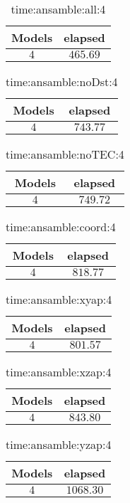 \begin{table}[!ht]
	\centering
	\begin{tabular}{|c|c|}
		\hline
		Models & elapsed \\ \hline
		$4$ & $465.69$ \\ \hline
	\end{tabular}
	\caption{time:ansamble:all:4}
	\label{tab:time:ansamble:all:4}
\end{table}

\begin{table}[!ht]
	\centering
	\begin{tabular}{|c|c|}
		\hline
		Models & elapsed \\ \hline
		$4$ & $743.77$ \\ \hline
	\end{tabular}
	\caption{time:ansamble:noDst:4}
	\label{tab:time:ansamble:noDst:4}
\end{table}

\begin{table}[!ht]
	\centering
	\begin{tabular}{|c|c|}
		\hline
		Models & elapsed \\ \hline
		$4$ & $749.72$ \\ \hline
	\end{tabular}
	\caption{time:ansamble:noTEC:4}
	\label{tab:time:ansamble:noTEC:4}
\end{table}

\begin{table}[!ht]
	\centering
	\begin{tabular}{|c|c|}
		\hline
		Models & elapsed \\ \hline
		$4$ & $818.77$ \\ \hline
	\end{tabular}
	\caption{time:ansamble:coord:4}
	\label{tab:time:ansamble:coord:4}
\end{table}

\begin{table}[!ht]
	\centering
	\begin{tabular}{|c|c|}
		\hline
		Models & elapsed \\ \hline
		$4$ & $801.57$ \\ \hline
	\end{tabular}
	\caption{time:ansamble:xyap:4}
	\label{tab:time:ansamble:xyap:4}
\end{table}

\begin{table}[!ht]
	\centering
	\begin{tabular}{|c|c|}
		\hline
		Models & elapsed \\ \hline
		$4$ & $843.80$ \\ \hline
	\end{tabular}
	\caption{time:ansamble:xzap:4}
	\label{tab:time:ansamble:xzap:4}
\end{table}

\begin{table}[!ht]
	\centering
	\begin{tabular}{|c|c|}
		\hline
		Models & elapsed \\ \hline
		$4$ & $1068.30$ \\ \hline
	\end{tabular}
	\caption{time:ansamble:yzap:4}
	\label{tab:time:ansamble:yzap:4}
\end{table}
